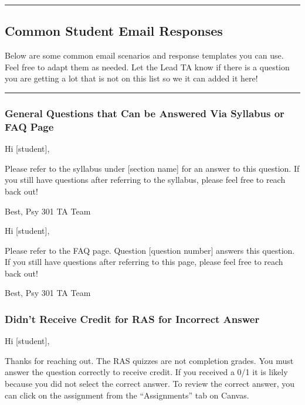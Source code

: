 \documentclass[
]{article}
\begin{document}
\begin{center}\rule{0.5\linewidth}{0.5pt}\end{center}

\hypertarget{common-student-email-responses}{%
\subsection{Common Student Email Responses}\label{common-student-email-responses}}

Below are some common email scenarios and response templates you can use. Feel free to adapt them as needed. Let the Lead TA know if there is a question you are getting a lot that is not on this list so we it can added it here!

\begin{center}\rule{0.5\linewidth}{0.5pt}\end{center}

\hypertarget{general-questions-that-can-be-answered-via-syllabus-or-faq-page}{%
\subsubsection{General Questions that Can be Answered Via Syllabus or FAQ Page}\label{general-questions-that-can-be-answered-via-syllabus-or-faq-page}}

Hi {[}student{]},

Please refer to the syllabus under {[}section name{]} for an answer to this question. If you still have questions after referring to the syllabus, please feel free to reach back out!

Best,
Psy 301 TA Team

Hi {[}student{]},

Please refer to the FAQ page. Question {[}question number{]} answers this question. If you still have questions after referring to this page, please feel free to reach back out!

Best,
Psy 301 TA Team

\hypertarget{didnt-receive-credit-for-ras-for-incorrect-answer}{%
\subsubsection{Didn't Receive Credit for RAS for Incorrect Answer}\label{didnt-receive-credit-for-ras-for-incorrect-answer}}

Hi {[}student{]},

Thanks for reaching out. The RAS quizzes are not completion grades. You must answer the question correctly to receive credit. If you received a 0/1 it is likely because you did not select the correct answer. To review the correct answer, you can click on the assignment from the ``Assignments'' tab on Canvas.
\end{document}
